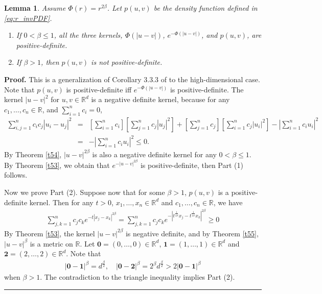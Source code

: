 \documentclass[]{elsarticle}
\newtheorem{lemma}[theorem]{Lemma}
\newenvironment{proof}[1][Proof]{\noindent\textbf{#1.} }{\ \rule{0.5em}{0.5em}}
\numberwithin{equation}{section}
\numberwithin{theorem}{section}
\newcommand\RR{{\mathbb R}}
\begin{document}
\begin{lemma}\label{l31}
Assume $\Phi(r)=r^{2\beta}$. Let $p(u,v)$ be the density function defined in \eqref{eq:r_invPDF}. 
\begin{enumerate}
\item[(1)] If $0<\beta \leq 1$, all the three kernels, $\Phi(|u-v|)$, $e^{-\Phi(|u-v|)}$, and $p(u,v)$, are positive-definite.
\item[(2)] If $\beta>1$,  then $p(u,v)$ is not positive-definite.
\end{enumerate}
\end{lemma}
\begin{proof}This is a generalization of Corollary 3.3.3 of \cite{BCR84} to the high-dimensional case. Note that $p(u,v)$ is positive-definite iff $e^{-\Phi(|u-v|)}$ is positive-definite.
The kernel $|u-v|^2$ for $u,v\in\RR^d$ is a negative definite kernel,  because for any $c_1,\ldots,c_n\in\RR$, and $\sum_{i=1}^{n}c_i=0$,
\begin{eqnarray*}
\sum_{i,j=1}^{n}c_ic_j|u_i-u_j|^2&=&\left[\sum_{i=1}^{n}c_i\right]\left[\sum_{j=1}^n c_j |u_j|^2\right]+\left[\sum_{j=1}^{n}c_j\right]\left[\sum_{i=1}^n c_j |u_i|^2\right]-\left|\sum_{i=1}^n c_iu_i\right|^2\\
&=&-\left|\sum_{i=1}^n c_iu_i\right|^2\leq 0.
\end{eqnarray*}
By Theorem \ref{t54}, $|u-v|^{2\beta}$ is also a negative definite kernel for any $0< \beta\leq 1$. By Theorem \ref{t53}, we obtain that $e^{-|u-v|^{2\beta}}$ is positive-definite, then Part (1) follows.

Now we prove Part (2). Suppose now that for some $\beta>1$, $p(u,v)$ is a positive-definite kernel. Then for any $t>0$, $x_1,\ldots,x_n\in \RR^d$ and $c_1,\ldots,c_n\in \RR$, we have
\begin{eqnarray*}
\sum_{j,k=1}^{n}c_jc_ke^{-t|x_j-x_k|^{2\beta}}=\sum_{j,k=1}^{n}c_jc_ke^{-\left|t^{\frac{1}{2\beta}}x_j-t^{\frac{1}{2\beta}}x_k\right|^{2\beta}}\geq 0
\end{eqnarray*}
By Theorem \ref{t53}, the kernel $|u-v|^{2\beta}$ is negative definite, and by Theorem \ref{t55}, $|u-v|^{\beta}$ is a metric on $\RR$. Let $\mathbf{0}=(0,\ldots,0)\in \RR^d$, $\mathbf{1}=(1,\ldots,1)\in \RR^d$ and $\mathbf{2}=(2,\ldots,2)\in \RR^d$. Note that
\begin{eqnarray*}
|\mathbf{0}-\mathbf{1}|^{\beta}=d^{\frac{\beta}{2}}, \quad 
|\mathbf{0}-\mathbf{2}|^{\beta}=2^{\beta}d^{\frac{\beta}{2}}> 2 |\mathbf{0}-\mathbf{1}|^{\beta}
\end{eqnarray*}
when $\beta>1$. The contradiction to the triangle inequality implies Part (2). 
\end{proof}
\end{document}
